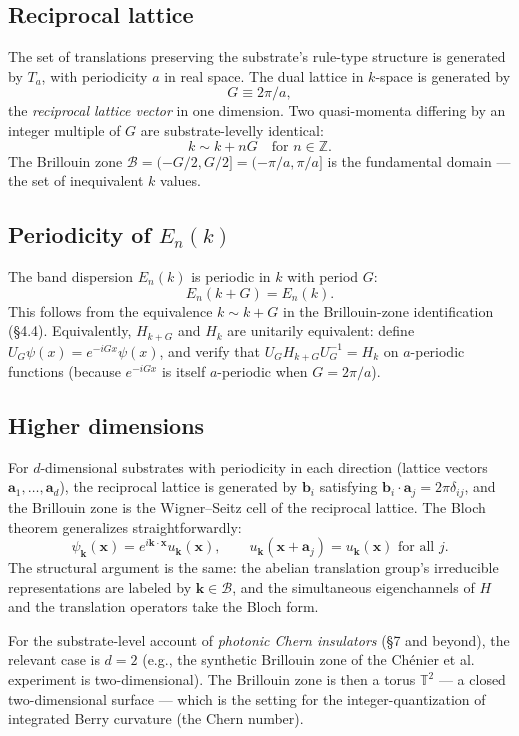 \documentclass[11pt,a4paper]{article}
\begin{document}
\subsection{Reciprocal lattice}

The set of translations preserving the substrate's rule-type structure is generated by $T_a$, with periodicity $a$ in real space. The dual lattice in $k$-space is generated by
\[
G \equiv 2\pi/a,
\]
the \emph{reciprocal lattice vector} in one dimension. Two quasi-momenta differing by an integer multiple of $G$ are substrate-levelly identical:
\[
k \sim k + nG \quad \text{for } n \in \mathbb{Z}.
\]
The Brillouin zone $\mathcal{B} = (-G/2, G/2] = (-\pi/a, \pi/a]$ is the fundamental domain --- the set of inequivalent $k$ values.

\subsection{Periodicity of $E_n(k)$}

The band dispersion $E_n(k)$ is periodic in $k$ with period $G$:
\[
E_n(k + G) = E_n(k).
\]
This follows from the equivalence $k \sim k + G$ in the Brillouin-zone identification (\S4.4). Equivalently, $H_{k+G}$ and $H_k$ are unitarily equivalent: define $U_G \psi(x) = e^{-iGx}\psi(x)$, and verify that $U_G H_{k+G} U_G^{-1} = H_k$ on $a$-periodic functions (because $e^{-iGx}$ is itself $a$-periodic when $G = 2\pi/a$).

\subsection{Higher dimensions}

For $d$-dimensional substrates with periodicity in each direction (lattice vectors $\mathbf{a}_1, \ldots, \mathbf{a}_d$), the reciprocal lattice is generated by $\mathbf{b}_i$ satisfying $\mathbf{b}_i \cdot \mathbf{a}_j = 2\pi\delta_{ij}$, and the Brillouin zone is the Wigner--Seitz cell of the reciprocal lattice. The Bloch theorem generalizes straightforwardly:
\[
\psi_\mathbf{k}(\mathbf{x}) = e^{i \mathbf{k}\cdot\mathbf{x}} u_\mathbf{k}(\mathbf{x}), \qquad u_\mathbf{k}(\mathbf{x} + \mathbf{a}_j) = u_\mathbf{k}(\mathbf{x}) \text{ for all } j.
\]
The structural argument is the same: the abelian translation group's irreducible representations are labeled by $\mathbf{k} \in \mathcal{B}$, and the simultaneous eigenchannels of $H$ and the translation operators take the Bloch form.

For the substrate-level account of \emph{photonic Chern insulators} (\S7 and beyond), the relevant case is $d = 2$ (e.g., the synthetic Brillouin zone of the Ch\'enier et al. experiment is two-dimensional). The Brillouin zone is then a torus $\mathbb{T}^2$ --- a closed two-dimensional surface --- which is the setting for the integer-quantization of integrated Berry curvature (the Chern number).
\end{document}
